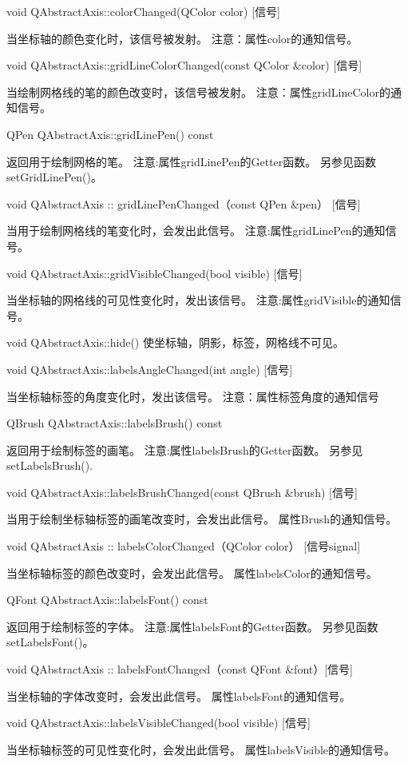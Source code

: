 void QAbstractAxis::colorChanged(QColor color) [信号] 

当坐标轴的颜色变化时，该信号被发射。 注意：属性color的通知信号。

void QAbstractAxis::gridLineColorChanged(const QColor \&color) [信号] 

当绘制网格线的笔的颜色改变时，该信号被发射。 注意：属性gridLineColor的通知信号。

QPen QAbstractAxis::gridLinePen() const

 返回用于绘制网格的笔。 注意:属性gridLinePen的Getter函数。 另参见函数setGridLinePen()。

void QAbstractAxis :: gridLinePenChanged（const QPen \&pen） [信号] 

当用于绘制网格线的笔变化时，会发出此信号。 注意:属性gridLinePen的通知信号。

void QAbstractAxis::gridVisibleChanged(bool visible) [信号] 

当坐标轴的网格线的可见性变化时，发出该信号。 注意:属性gridVisible的通知信号。

void QAbstractAxis::hide() 使坐标轴，阴影，标签，网格线不可见。

void QAbstractAxis::labelsAngleChanged(int angle) [信号]

 当坐标轴标签的角度变化时，发出该信号。 注意：属性标签角度的通知信号

QBrush QAbstractAxis::labelsBrush() const 

返回用于绘制标签的画笔。 注意:属性labelsBrush的Getter函数。 另参见setLabelsBrush().

void QAbstractAxis::labelsBrushChanged(const QBrush \&brush) [信号] 

当用于绘制坐标轴标签的画笔改变时，会发出此信号。 属性Brush的通知信号。

void QAbstractAxis :: labelsColorChanged（QColor color） [信号signal] 

当坐标轴标签的颜色改变时，会发出此信号。 属性labelsColor的通知信号。

QFont QAbstractAxis::labelsFont() const 

返回用于绘制标签的字体。 注意:属性labelsFont的Getter函数。 另参见函数setLabelsFont()。

void QAbstractAxis :: labelsFontChanged（const QFont \&font）[信号] 

当坐标轴的字体改变时，会发出此信号。 属性labelsFont的通知信号。

void QAbstractAxis::labelsVisibleChanged(bool visible) [信号] 

当坐标轴标签的可见性变化时，会发出此信号。 属性labelsVisible的通知信号。

